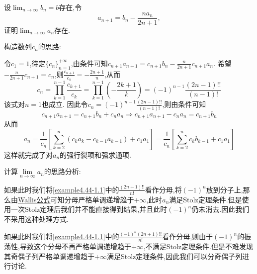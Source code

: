 \documentclass[../../main.tex]{subfiles}%
\begin{document}
\begin{example}
设\(\lim_{n\rightarrow\infty}b_n = b\)存在,令
\[
a_{n + 1}=b_n-\frac{na_n}{2n + 1},
\]
证明\(\lim_{n\rightarrow\infty}a_n\)存在.
\end{example}
\begin{note}
\hypertarget{构造数列c_n的思路}{构造数列$c_n$的思路:}
令\(c_1 = 1\),待定\(\{ c_n \}_{n = 1}^{+\infty}\),由条件可知\(c_{n + 1}a_{n + 1} = c_{n + 1}b_n - \frac{n}{2n + 1}c_{n + 1}a_n\).
希望\(-\frac{n}{2n + 1}c_{n + 1} = c_n\),则\(\frac{c_{n + 1}}{c_n} = -\frac{2n + 1}{n}\),从而
\[
c_n = \prod_{k = 1}^{n - 1}{\frac{c_{k + 1}}{c_k}} = \prod_{k = 1}^{n - 1}{\left( -\frac{2k + 1}{k} \right)} = (-1)^{n - 1}\frac{(2n - 1)!!}{(n - 1)!}
\]
该式对\(n = 1\)也成立.
因此令\(c_n = (-1)^{n - 1}\frac{(2n - 1)!!}{(n - 1)!}\),则由条件可知
\[
c_{n + 1}a_{n + 1} = c_{n + 1}b_n + c_na_n \Rightarrow c_{n + 1}a_{n + 1} - c_na_n = c_{n + 1}b_n
\]
从而
\[
a_n = \frac{1}{c_n}\left[ \sum_{k = 2}^n{(c_ka_k - c_{k - 1}a_{k - 1})} + c_1a_1 \right] = \frac{1}{c_n}\left[ \sum_{k = 2}^n{c_kb_{k - 1}} + c_1a_1 \right]
\]
这样就完成了对\(a_n\)的强行裂项和强求通项.
\end{note}
\begin{remark}
\hypertarget{example4.44解法的思路分析}{计算$\underset{n\rightarrow \infty}{\lim}a_n$的思路分析:}
如果此时我们将\eqref{example4.44-1.1}中的$\frac{\left( 2n+1 \right) !!}{n!}$看作分母,将$\left( -1 \right) ^n$放到分子上,那么由\hyperref[theorem:Wallis公式]{Wallis公式}可知分母严格单调递增趋于$+\infty$,此时$a_n$满足Stolz定理条件.但是使用一次Stolz定理后我们并不能直接得到结果,并且此时$(-1)^n$仍未消去.因此我们不采用这种处理方式.

如果此时我们将\eqref{example4.44-1.1}中的$\frac{\left( -1 \right) ^n\left( 2n+1 \right) !!}{n!}$看作分母,则由于$\left( -1 \right) ^n$的振荡性,导致这个分母不再严格单调递增趋于$+\infty$,不满足Stolz定理条件.但是不难发现其奇偶子列严格单调递增趋于$+\infty$满足Stolz定理条件,因此我们可以分奇偶子列进行讨论.
\end{remark}
\end{document}
